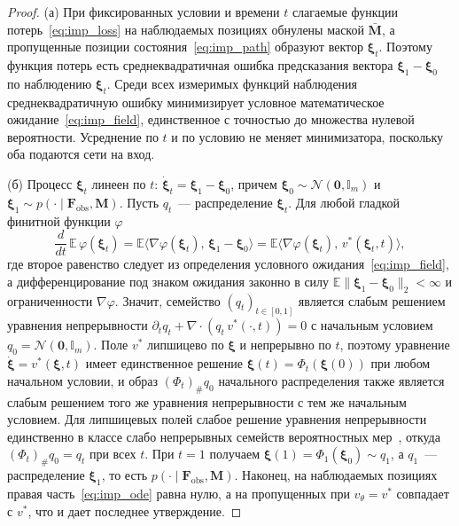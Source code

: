 \begin{proof}
(а) При фиксированных условии и времени $t$ слагаемые функции потерь~\eqref{eq:imp_loss} на наблюдаемых позициях обнулены маской $\bar{\mathbf{M}}$, а пропущенные позиции состояния~\eqref{eq:imp_path} образуют вектор $\boldsymbol{\xi}_t$. Поэтому функция потерь есть среднеквадратичная ошибка предсказания вектора $\boldsymbol{\xi}_1 - \boldsymbol{\xi}_0$ по наблюдению $\boldsymbol{\xi}_t$. Среди всех измеримых функций наблюдения среднеквадратичную ошибку минимизирует условное математическое ожидание~\eqref{eq:imp_field}, единственное с точностью до множества нулевой вероятности. Усреднение по $t$ и по условию не меняет минимизатора, поскольку оба подаются сети на вход.

(б) Процесс $\boldsymbol{\xi}_t$ линеен по $t$: $\dot{\boldsymbol{\xi}}_t = \boldsymbol{\xi}_1 - \boldsymbol{\xi}_0$, причем $\boldsymbol{\xi}_0 \sim \mathcal{N}(\mathbf{0}, \mathbb{I}_m)$ и $\boldsymbol{\xi}_1 \sim p(\cdot \mid \mathbf{F}_{\mathrm{obs}}, \mathbf{M})$. Пусть $q_t$~--- распределение $\boldsymbol{\xi}_t$. Для любой гладкой финитной функции $\varphi$
\begin{equation*}
\frac{d}{dt}\, \mathbb{E}\,\varphi(\boldsymbol{\xi}_t) = \mathbb{E}\big\langle \nabla\varphi(\boldsymbol{\xi}_t),\, \boldsymbol{\xi}_1 - \boldsymbol{\xi}_0 \big\rangle = \mathbb{E}\big\langle \nabla\varphi(\boldsymbol{\xi}_t),\, v^{*}(\boldsymbol{\xi}_t, t) \big\rangle,
\end{equation*}
где второе равенство следует из определения условного ожидания~\eqref{eq:imp_field}, а дифференцирование под знаком ожидания законно в силу $\mathbb{E}\|\boldsymbol{\xi}_1 - \boldsymbol{\xi}_0\|_2 < \infty$ и ограниченности $\nabla\varphi$. Значит, семейство $(q_t)_{t \in [0,1]}$ является слабым решением уравнения непрерывности $\partial_t q_t + \nabla \cdot (q_t\, v^{*}(\cdot, t)) = 0$ с начальным условием $q_0 = \mathcal{N}(\mathbf{0}, \mathbb{I}_m)$. Поле $v^{*}$ липшицево по $\boldsymbol{\xi}$ и непрерывно по $t$, поэтому уравнение $\dot{\boldsymbol{\xi}} = v^{*}(\boldsymbol{\xi}, t)$ имеет единственное решение $\boldsymbol{\xi}(t) = \Phi_t(\boldsymbol{\xi}(0))$ при любом начальном условии, и образ $(\Phi_t)_{\#} q_0$ начального распределения также является слабым решением того же уравнения непрерывности с тем же начальным условием. Для липшицевых полей слабое решение уравнения непрерывности единственно в классе слабо непрерывных семейств вероятностных мер~\cite[гл.~8]{ambrosio2008gradient}, откуда $(\Phi_t)_{\#} q_0 = q_t$ при всех $t$. При $t = 1$ получаем $\boldsymbol{\xi}(1) = \Phi_1(\boldsymbol{\xi}_0) \sim q_1$, а $q_1$~--- распределение $\boldsymbol{\xi}_1$, то есть $p(\cdot \mid \mathbf{F}_{\mathrm{obs}}, \mathbf{M})$. Наконец, на наблюдаемых позициях правая часть~\eqref{eq:imp_ode} равна нулю, а на пропущенных при $v_{\theta} = v^{*}$ совпадает с $v^{*}$, что и дает последнее утверждение.
\end{proof}

